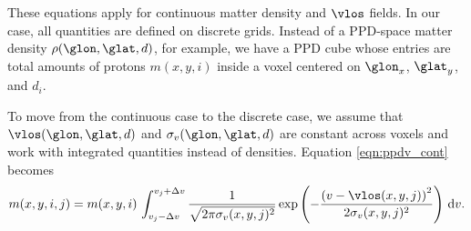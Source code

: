 These equations apply for continuous matter density and $\vlos$ fields.
In our case, all quantities are defined on discrete grids. 
Instead of a PPD-space matter density $\rho(\glon, \glat, d)$, for example, we have a PPD cube whose entries are total amounts of protons $m(x, y, i)$ inside a voxel centered on $\glon_x$, $\glat_y$, and $d_i$.

To move from the continuous case to the discrete case, we assume that $\vlos(\glon, \glat, d)$ and $\sigma_v(\glon, \glat, d)$ are constant across voxels and work with integrated quantities instead of densities. 
Equation \ref{eqn:ppdv_cont} becomes
\begin{equation}
  \label{eqn:ppdv_disc}
  m(x, y, i, j) = m(x, y, i) \, \int_{v_j - \Delta v}^{v_j + \Delta v} 
 \frac{1}{\sqrt{2 \pi \sigma_v(x, y, j)^2}}
    \exp\left(- \frac{\left( v - \vlos(x, y, j) \right)^2}{2 \sigma_v(x, y, j)^2} \right)\, {\rm d}v.
\end{equation}




